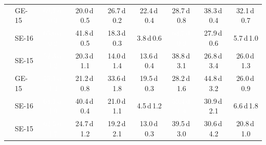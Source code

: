 \begin{table}[!htb]
\begin{tabular}{ll cccc @{\hspace{6pt}} ccc}
 & GE-15 & \cellcolor[HTML]{2F7FBC}\textcolor{white}{69.7\,{\tiny\textsf{d}\,}0.3} & \cellcolor[HTML]{D0E1F2}20.0\,{\tiny\textsf{d}\,}0.5 & \cellcolor[HTML]{C1D9ED}26.7\,{\tiny\textsf{d}\,}0.2 & \cellcolor[HTML]{CBDEF1}22.4\,{\tiny\textsf{d}\,}0.4 & \cellcolor[HTML]{BAD6EB}28.7\,{\tiny\textsf{d}\,}0.8 & \cellcolor[HTML]{9AC8E0}38.3\,{\tiny\textsf{d}\,}0.4 & \cellcolor[HTML]{AFD1E7}32.1\,{\tiny\textsf{d}\,}0.7 \\
 & SE-16 & \cellcolor[HTML]{3989C1}\textcolor{white}{65.6\,{\tiny\textsf{d}\,}0.2} & \cellcolor[HTML]{8CC0DD}41.8\,{\tiny\textsf{d}\,}0.5 & \cellcolor[HTML]{D3E4F3}18.3\,{\tiny\textsf{d}\,}0.3 & \cellcolor[HTML]{F0F6FD}3.8\,{\tiny\textsf{d}\,}0.6 & \cellcolor[HTML]{3E8EC4}\textcolor{white}{63.7\,{\tiny\textsf{d}\,}0.9} & \cellcolor[HTML]{BDD7EC}27.9\,{\tiny\textsf{d}\,}0.6 & \cellcolor[HTML]{ECF4FB}5.7\,{\tiny\textsf{d}\,}1.0 \\
\addlinespace[2pt]
\multirow{3}{*}{\textbf{40--49}} & SE-15 & \cellcolor[HTML]{64A9D3}\textcolor{white}{52.3\,{\tiny\textsf{d}\,}1.2} & \cellcolor[HTML]{D0E1F2}20.3\,{\tiny\textsf{d}\,}1.1 & \cellcolor[HTML]{DCE9F6}14.0\,{\tiny\textsf{d}\,}1.4 & \cellcolor[HTML]{DCEAF6}13.6\,{\tiny\textsf{d}\,}0.4 & \cellcolor[HTML]{99C7E0}38.8\,{\tiny\textsf{d}\,}3.1 & \cellcolor[HTML]{C1D9ED}26.8\,{\tiny\textsf{d}\,}3.4 & \cellcolor[HTML]{C3DAEE}26.0\,{\tiny\textsf{d}\,}1.3 \\
 & GE-15 & \cellcolor[HTML]{2070B4}\textcolor{white}{75.1\,{\tiny\textsf{d}\,}1.4} & \cellcolor[HTML]{CDE0F1}21.2\,{\tiny\textsf{d}\,}0.8 & \cellcolor[HTML]{AACFE5}33.6\,{\tiny\textsf{d}\,}1.8 & \cellcolor[HTML]{D1E2F3}19.5\,{\tiny\textsf{d}\,}0.3 & \cellcolor[HTML]{BCD7EB}28.2\,{\tiny\textsf{d}\,}1.6 & \cellcolor[HTML]{81BADB}44.8\,{\tiny\textsf{d}\,}3.2 & \cellcolor[HTML]{C3DAEE}26.0\,{\tiny\textsf{d}\,}0.9 \\
 & SE-16 & \cellcolor[HTML]{3383BE}\textcolor{white}{68.1\,{\tiny\textsf{d}\,}1.0} & \cellcolor[HTML]{92C4DE}40.4\,{\tiny\textsf{d}\,}0.4 & \cellcolor[HTML]{CEE0F2}21.0\,{\tiny\textsf{d}\,}1.1 & \cellcolor[HTML]{EEF5FC}4.5\,{\tiny\textsf{d}\,}1.2 & \cellcolor[HTML]{4D99CA}\textcolor{white}{59.4\,{\tiny\textsf{d}\,}1.4} & \cellcolor[HTML]{B3D3E8}30.9\,{\tiny\textsf{d}\,}2.1 & \cellcolor[HTML]{EAF3FB}6.6\,{\tiny\textsf{d}\,}1.8 \\
\addlinespace[2pt]
\multirow{3}{*}{\textbf{50--59}} & SE-15 & \cellcolor[HTML]{4191C6}\textcolor{white}{62.5\,{\tiny\textsf{d}\,}1.7} & \cellcolor[HTML]{C7DBEF}24.7\,{\tiny\textsf{d}\,}1.2 & \cellcolor[HTML]{D1E2F3}19.2\,{\tiny\textsf{d}\,}2.1 & \cellcolor[HTML]{DDEAF7}13.0\,{\tiny\textsf{d}\,}0.3 & \cellcolor[HTML]{95C5DF}39.5\,{\tiny\textsf{d}\,}3.0 & \cellcolor[HTML]{B4D3E9}30.6\,{\tiny\textsf{d}\,}4.2 & \cellcolor[HTML]{CEE0F2}20.8\,{\tiny\textsf{d}\,}1.0 \\

\end{tabular}
\end{table}
